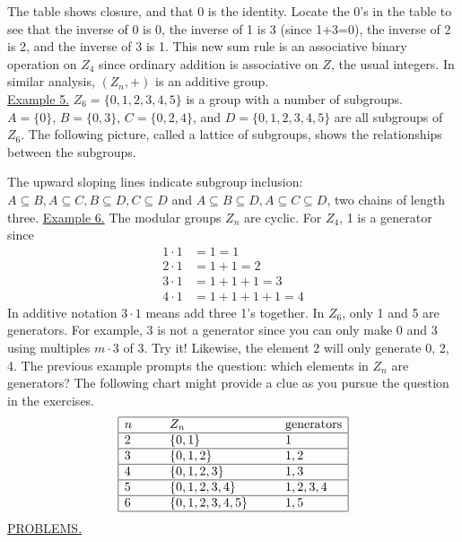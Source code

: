 \documentclass[12pt]{article}
\theoremstyle{definition}
\begin{document}
The table shows closure, and that 0 is the identity.  Locate the 0's in the table to see that the inverse of 0 is 0, the inverse of 1 is 3 (since 1+3=0), the inverse of 2 is 2, and the inverse of 3 is 1.  This new sum rule is an associative binary operation on $Z_4$ since ordinary addition is associative on $Z$, the usual integers.  In similar analysis, $(Z_n,+)$ is an additive group.\\
\underline{Example 5.}  $Z_6 = \{0,1,2,3,4,5\}$ is a group with a number of subgroups.  $A=\{0\},\, B=\{0,3\},\, C=\{0,2,4\}$, and $D=\{0,1,2,3,4,5\}$ are all subgroups of $Z_6$.  The following picture, called a lattice of subgroups, shows the relationships between the subgroups.\\[.1in]
\centerline{}
The upward sloping lines indicate subgroup inclusion: $A\subseteq B, A\subseteq C, B\subseteq D, C\subseteq D$ and $A\subseteq B\subseteq D, A\subseteq C\subseteq D$, two chains of length three.
%
\underline{Example 6.}  The modular groups $Z_n$ are cyclic.  For $Z_4$, 1 is a generator since
\begin{equation*}\begin{split}
1\cdot 1&= 1=1\\
2\cdot 1 &=1+1=2\\
3\cdot 1 &=1+1+1 = 3\\
4\cdot 1 &=1+1+1+1 =4
\end{split}\end{equation*}
In additive notation $3\cdot 1$ means add three 1's together.  In $Z_6$, only 1 and 5 are generators.  For example, 3 is not a generator since you can only make 0 and 3 using multiples $m\cdot3$ of 3.  Try it!  Likewise, the element 2 will only generate 0, 2, 4.  The previous example prompts the question: which elements in $Z_n$ are generators?  The following chart might provide a clue as you pursue the question in the exercises.
$$\begin{array}{|lll|}
\hline
n \qquad& Z_n & \text{generators}\\
\hline
2 & \{0,1\} & 1\\
\hline
3 & \{0,1,2\}  & 1,2\\
\hline
4 & \{0,1,2,3\} & 1,3\\
\hline
5 & \{0,1,2,3,4\} & 1,2,3,4\\
\hline
6 & \{0,1,2,3,4,5\}\qquad & 1, 5\\
\hline
\end{array}$$
\underline{PROBLEMS.}
\end{document}
